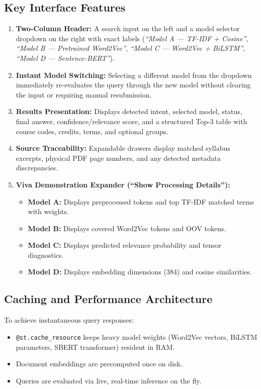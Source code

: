\documentclass[12pt,a4paper]{report}
\begin{document}
\subsection{Key Interface Features}
\begin{enumerate}
    \item \textbf{Two-Column Header:} A search input on the left and a model selector dropdown on the right with exact labels (\textit{``Model A --- TF-IDF + Cosine''}, \textit{``Model B --- Pretrained Word2Vec''}, \textit{``Model C --- Word2Vec + BiLSTM''}, \textit{``Model D --- Sentence-BERT''}).
    \item \textbf{Instant Model Switching:} Selecting a different model from the dropdown immediately re-evaluates the query through the new model without clearing the input or requiring manual resubmission.
    \item \textbf{Results Presentation:} Displays detected intent, selected model, status, final answer, confidence/relevance score, and a structured Top-3 table with course codes, credits, terms, and optional groups.
    \item \textbf{Source Traceability:} Expandable drawers display matched syllabus excerpts, physical PDF page numbers, and any detected metadata discrepancies.
    \item \textbf{Viva Demonstration Expander (``Show Processing Details''):}
    \begin{itemize}
        \item \textbf{Model A:} Displays preprocessed tokens and top TF-IDF matched terms with weights.
        \item \textbf{Model B:} Displays covered Word2Vec tokens and OOV tokens.
        \item \textbf{Model C:} Displays predicted relevance probability and tensor diagnostics.
        \item \textbf{Model D:} Displays embedding dimensions (384) and cosine similarities.
    \end{itemize}
\end{enumerate}

\subsection{Caching and Performance Architecture}
To achieve instantaneous query responses:
\begin{itemize}
    \item \texttt{@st.cache\_resource} keeps heavy model weights (Word2Vec vectors, BiLSTM parameters, SBERT transformer) resident in RAM.
    \item Document embeddings are precomputed once on disk.
    \item Queries are evaluated via live, real-time inference on the fly.
\end{itemize}
\end{document}
